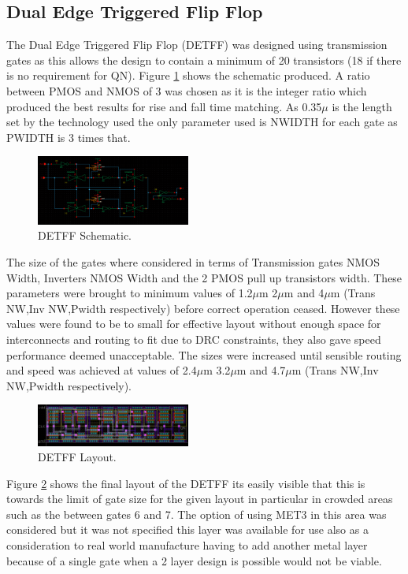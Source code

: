 \subsection{Dual Edge Triggered Flip Flop}

The Dual Edge Triggered Flip Flop (DETFF) was designed using transmission gates as this allows the design to contain a minimum of 20 transistors (18 if there is no requirement for QN). Figure \ref{fig:DETFFSchem} shows the schematic produced. A ratio between PMOS and NMOS of 3 was chosen as it is the integer ratio which produced the best results for rise and fall time matching. As 0.35$\mu$ is the length set by the technology used the only parameter used is NWIDTH for each gate as PWIDTH is 3 times that.

\begin{figure}[h]  
\centering
   \includegraphics[width=0.45\textwidth]{Figures/DETFFSchem.png}
\caption{DETFF Schematic.}
\label {fig:DETFFSchem}
\end{figure}

The size of the gates where considered in terms of Transmission gates NMOS Width, Inverters NMOS Width and the 2 PMOS pull up transistors width. These parameters were brought to minimum  values of 1.2$\mu$m 2$\mu$m and 4$\mu$m (Trans NW,Inv NW,Pwidth respectively) before correct operation ceased. However these values were found to be to small for effective layout without enough space for interconnects and routing to fit due to DRC constraints, they also gave speed performance deemed unacceptable. The sizes were increased until sensible routing and speed was achieved  at values of 2.4$\mu$m 3.2$\mu$m and 4.7$\mu$m (Trans NW,Inv NW,Pwidth respectively).

\begin{figure}[h]  
\centering
   \includegraphics[width=0.45\textwidth]{Figures/DETFFLayout.png}
\caption{DETFF Layout.}
\label {fig:DETFFLayout}
\end{figure}

Figure \ref{fig:DETFFLayout} shows the final layout of the DETFF its easily visible that this is towards the limit of gate size for the given layout in particular in crowded areas such as the between gates 6 and 7. The option of using MET3 in this area was considered but it was not specified this layer was available for use also as a consideration to real world manufacture having to add another metal layer because of a single gate when a 2 layer design is possible would not be viable.

